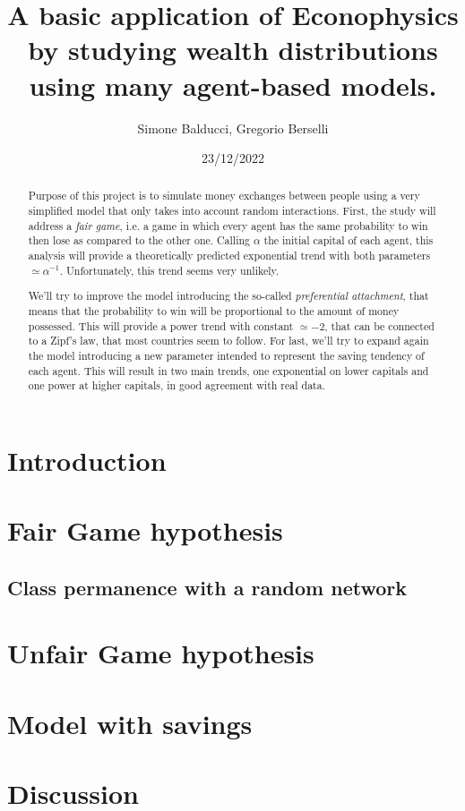 \documentclass[12pt,a4paper]{article}
\title{A basic application of Econophysics by studying wealth distributions using many agent-based models.}
\author{Simone Balducci, Gregorio Berselli}
\date{23/12/2022}
\begin{document}
\maketitle

\begin{abstract}
    Purpose of this project is to simulate money exchanges between people using a very simplified model that only takes into account random interactions.
    First, the study will address a \emph{fair game}, i.e. a game in which every agent has the same probability to win then lose as compared to the other one.
    Calling $\alpha$ the initial capital of each agent, this analysis will provide a theoretically predicted exponential trend with both parameters $\simeq \alpha^{-1}$. 
    Unfortunately, this trend seems very unlikely.

    We'll try to improve the model introducing the so-called \emph{preferential attachment}, that means that the probability to win will be proportional to the amount of money possessed.
    This will provide a power trend with constant $\simeq -2$, that can be connected to a Zipf's law, that most countries seem to follow.
    For last, we'll try to expand again the model introducing a new parameter intended to represent the saving tendency of each agent.
    This will result in two main trends, one exponential on lower capitals and one power at higher capitals, in good agreement with real data. 
\end{abstract}

\newpage
\thispagestyle{empty}
\addtocounter{page}{-2}
\mbox{}

\tableofcontents
\pagebreak

\section*{Introduction}

\pagebreak

\section{Fair Game hypothesis}


\subsection{Class permanence with a random network}

\pagebreak

\section{Unfair Game hypothesis}

\pagebreak

\section{Model with savings}

\pagebreak
\clearpage

\section{Discussion}


\newpage
\thispagestyle{empty}
\mbox{}

\printbibliography
\end{document}
